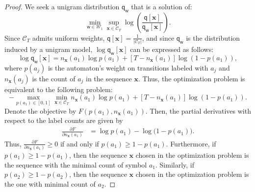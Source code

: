 \documentclass{article}
\newcommand{\sC}{\mathscr C}
\newcommand{\bx}{{\mathbf x}}
\newcommand{\sfq}{{\mathsf q}}
\newcommand{\sfw}{{\mathsf w}}
\newcommand{\cW}{\mathcal W}
\begin{document}
\begin{proof}
  We seek a unigram distribution $\sfq_{\sfw}$ that is a solution of:
  $$\min_{\sfw \in \cW_1} \sup_{\bx \in \sC_T} \log\left( \frac{ \sfq[\bx]}{\sfq_{\sfw}[\bx]} \right).$$
  Since $\sC_T$ admits uniform weights, $\sfq[\bx]  = \frac{1}{|\sC_T|}$, and since $\sfq_{\sfw}$ is the distribution induced by a unigram model,
  $\log \sfq_{\sfw}[\bx]$ can be expressed as follows:
  $$\log \sfq_{\sfw}[\bx] = n_\bx(a_1) \log p(a_1) + \left[T - n_\bx(a_1) \right] \log\left( 1 - p(a_1) \right),$$
  where $p(a_j)$ is the automaton's weight on transitions labeled with $a_j$ and $n_\bx(a_j)$ is the count of $a_j$ in the sequence $\bx$. Thus, the optimization problem is equivalent to the following problem:
  $$ - \max_{p(a_1) \in [0,1]} \min_{\bx \in \sC_T}  n_\bx(a_1) \log p(a_1) + \left[T - n_\bx(a_1) \right] \log\left( 1 - p(a_1) \right).$$
  Denote the objective by $F(p(a_1), n_\bx(a_1))$. Then, the partial derivatives with respect to the label counts are given by
  \begin{align*}
    \frac{\partial F}{\partial n_\bx(a_1)} 
    & = \log p(a_1) - \log\Big( 1 - p(a_1) \Big).
  \end{align*}
  Thus, $\frac{\partial F}{\partial n_\bx(a_1)} \geq 0$ if and only if $p(a_1) \geq 1 - p(a_1)$. Furthermore, if $p(a_1) \geq 1 - p(a_1)$,
  then the sequence $\bx$ chosen in the optimization problem is the sequence with the minimal count of symbol $a_1$.
  Similarly, if $p(a_2) \geq 1 - p(a_2)$, then the sequence $\bx$ chosen in the optimization
  problem is the one with minimal count of $a_2$.


\end{proof}
\end{document}
